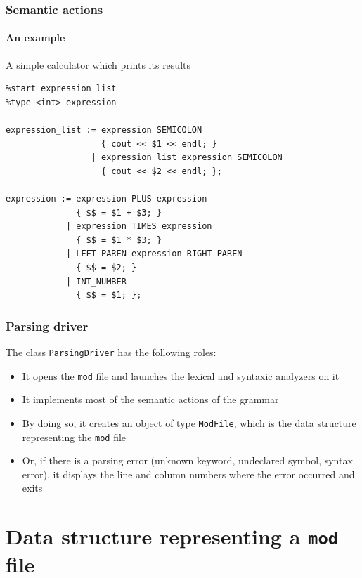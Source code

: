 \documentclass{beamer}
\begin{document}
\begin{frame}[fragile]
\frametitle{Semantic actions}
\framesubtitle{An example}
\begin{block}{A simple calculator which prints its results}
\begin{footnotesize}
\begin{verbatim}
%start expression_list
%type <int> expression

expression_list := expression SEMICOLON
                   { cout << $1 << endl; }
                 | expression_list expression SEMICOLON
                   { cout << $2 << endl; };

expression := expression PLUS expression
              { $$ = $1 + $3; }
            | expression TIMES expression
              { $$ = $1 * $3; }
            | LEFT_PAREN expression RIGHT_PAREN
              { $$ = $2; }
            | INT_NUMBER
              { $$ = $1; };
\end{verbatim}
\end{footnotesize}
\end{block}
\end{frame}

\begin{frame}
\frametitle{Parsing driver}

The class \texttt{ParsingDriver} has the following roles:
\begin{itemize}
\item It opens the \texttt{mod} file and launches the lexical and syntaxic analyzers on it
\item It implements most of the semantic actions of the grammar
\item By doing so, it creates an object of type \texttt{ModFile}, which is the data structure representing the \texttt{mod} file
\item Or, if there is a parsing error (unknown keyword, undeclared symbol, syntax error), it displays the line and column numbers where the error occurred and exits
\end{itemize}
\end{frame}

\section{Data structure representing a \texttt{mod} file}
\end{document}
